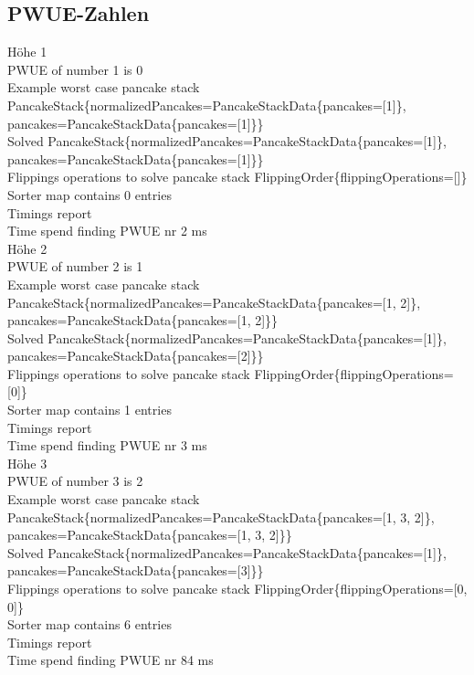 \subsection{PWUE-Zahlen}\label{subsec:pwue-zahlen}
Höhe 1 \\
PWUE of number 1 is 0 \\
Example worst case pancake stack PancakeStack\{normalizedPancakes=PancakeStackData\{pancakes=[1]\}, pancakes=PancakeStackData\{pancakes=[1]\}\} \\
Solved PancakeStack\{normalizedPancakes=PancakeStackData\{pancakes=[1]\}, pancakes=PancakeStackData\{pancakes=[1]\}\} \\
Flippings operations to solve pancake stack FlippingOrder\{flippingOperations=[]\} \\
Sorter map contains 0 entries \\
Timings report \\
Time spend finding PWUE nr 2 ms \\
Höhe 2 \\
PWUE of number 2 is 1 \\
Example worst case pancake stack PancakeStack\{normalizedPancakes=PancakeStackData\{pancakes=[1, 2]\}, pancakes=PancakeStackData\{pancakes=[1, 2]\}\} \\
Solved PancakeStack\{normalizedPancakes=PancakeStackData\{pancakes=[1]\}, pancakes=PancakeStackData\{pancakes=[2]\}\} \\
Flippings operations to solve pancake stack FlippingOrder\{flippingOperations=[0]\} \\
Sorter map contains 1 entries \\
Timings report \\
Time spend finding PWUE nr 3 ms \\
Höhe 3 \\
PWUE of number 3 is 2 \\
Example worst case pancake stack PancakeStack\{normalizedPancakes=PancakeStackData\{pancakes=[1, 3, 2]\}, pancakes=PancakeStackData\{pancakes=[1, 3, 2]\}\} \\
Solved PancakeStack\{normalizedPancakes=PancakeStackData\{pancakes=[1]\}, pancakes=PancakeStackData\{pancakes=[3]\}\} \\
Flippings operations to solve pancake stack FlippingOrder\{flippingOperations=[0, 0]\} \\
Sorter map contains 6 entries \\
Timings report \\
Time spend finding PWUE nr 84 ms \\
